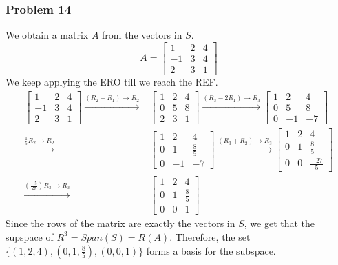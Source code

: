\documentclass[a4paper,12pt]{article}
\begin{document}
\subsubsection*{Problem 14}
We obtain a matrix $A$ from the vectors in $S$. \[A=\begin{bmatrix}
  1 & 2 & 4 \\
  -1 & 3 & 4 \\
  2 & 3 & 1
\end{bmatrix}\]
We keep applying the ERO till we reach the REF.
\begin{align*}
    \begin{bmatrix}
  1 & 2 & 4 \\
  -1 & 3 & 4 \\
  2 & 3 & 1
\end{bmatrix} \xrightarrow{{(R_2+R_1)}\to{R_2}}&
 \begin{bmatrix}
  1 & 2 & 4 \\
  0 & 5 & 8 \\
  2 & 3 & 1
\end{bmatrix} \xrightarrow{{(R_3-2R_1)}\to{R_3}}
\begin{bmatrix}
  1 & 2 & 4 \\
  0 & 5 & 8 \\
  0 & -1 & -7
\end{bmatrix}\\ \xrightarrow{{\frac{1}{5} R_2}\to{R_2}}&
\begin{bmatrix}
  1 & 2 & 4 \\
  0 & 1 & \frac{8}{5} \\
  0 & -1 & -7
\end{bmatrix} \xrightarrow{{(R_3+R_2)}\to{R_3}}
\begin{bmatrix}
  1 & 2 & 4 \\
  0 & 1 & \frac{8}{5} \\
  0 & 0 & \frac{-27}{5}
\end{bmatrix}\\ \xrightarrow{{(\frac{-5}{27})R_3}\to{R_3}}&
\begin{bmatrix}
  1 & 2 & 4 \\
  0 & 1 & \frac{8}{5} \\
  0 & 0 & 1
\end{bmatrix}
\end{align*}
Since the rows of the matrix are exactly the vectors in $S$, we get that the supspace of $R^3= Span(S)= R(A).$
Therefore, the set $\{(1,2,4),(0,1,\frac{8}{5}), (0,0,1)\}$ forms a basis for the subspace.
\end{document}
